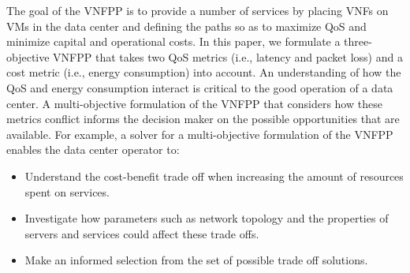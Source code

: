 The goal of the VNFPP is to provide a number of services by placing VNFs on VMs in the data center and defining the paths so as to maximize QoS and minimize capital and operational costs. In this paper, we formulate a three-objective VNFPP that takes two QoS metrics (i.e., latency and packet loss) and a cost metric (i.e., energy consumption) into account. An understanding of how the QoS and energy consumption interact is critical to the good operation of a data center. A multi-objective formulation of the VNFPP that considers how these metrics conflict informs the decision maker on the possible opportunities that are available. For example, a solver for a multi-objective formulation of the VNFPP enables the data center operator to:
\begin{itemize}
	\item Understand the cost-benefit trade off when increasing the amount of resources spent on services.
	\item Investigate how parameters such as network topology and the properties of servers and services could affect these trade offs.
	\item Make an informed selection from the set of possible trade off solutions.
\end{itemize}

